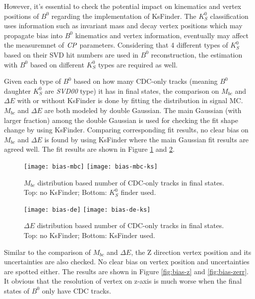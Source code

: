 However, it's essential to check the potential impact on kinematics and vertex positions of $B^0$ regarding the implementation of KsFinder. The $K_S^0$ classification uses information such as invariant mass and decay vertex positions which may propagate bias into $B^0$ kinematics and vertex information, eventually may affect the measuremnet of $\it{CP}$ parameters. Considering that 4 different types of $K_S^0$ based on their SVD hit numbers are used in $B^0$ reconstruction, the estimation with $B^0$ based on different $K_S^0$ types are required as well.
 
 Given each type of $B^0$ based on how many CDC-only tracks (meaning $B^0$ daughter $K_S^0$ are \textit{SVD00} type) it has in final states, the comparison on $M_{bc}$ and $\Delta{E}$ with or without KsFinder is done by fitting the distribution in signal MC. $M_{bc}$ and $\Delta{E}$ are both modeled by double Gaussian. The main Gaussian (with larger fraction) among the double Gaussian is used for checking the fit shape change by using KsFinder. Comparing corresponding fit results, no clear bias on $M_{bc}$ and $\Delta{E}$ is found by using KsFinder where the main Gaussian fit results are agreed well. The fit results are shown in Figure \ref{fig:mbc_bias} and \ref{fig:de_bias}. 
 
 \begin{figure}[htpb]
 	\centering
 	\texttt{[image: bias-mbc]}
 	\texttt{[image: bias-mbc-ks]}
 	\caption{$M_{bc}$ distribution based number of CDC-only tracks in final states. Top: no KsFinder; Bottom: $K_S^0$ finder used.}
 	\label{fig:mbc_bias}
 \end{figure}
 \begin{figure}[htpb]
	\centering
	\texttt{[image: bias-de]}
	\texttt{[image: bias-de-ks]}
	\caption{$\Delta{E}$ distribution based number of CDC-only tracks in final states. Top: no KsFinder; Bottom: KsFinder used.}
	\label{fig:de_bias}
\end{figure}

Similar to the comparison of $M_{bc}$ and $\Delta{E}$, the Z direction vertex position and its uncertainties are also checked. No clear bias on vertex position and uncertainties are spotted either. The results are shown in Figure \ref{fig:bias-z} and \ref{fig:bias-zerr}. It obvious that the resolution of vertex on z-axis is much worse when the final states of $B^0$ only have CDC tracks. 

